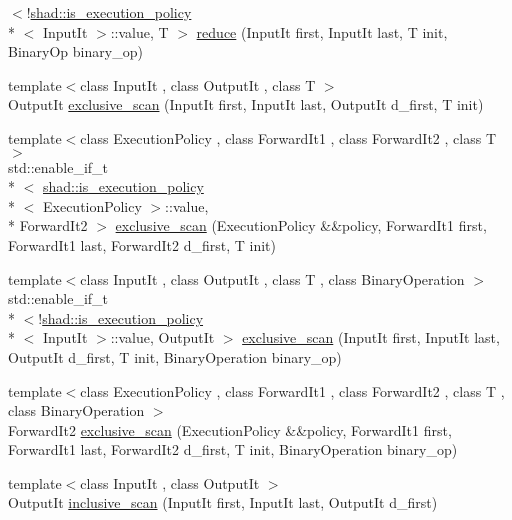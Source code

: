 \begin{DoxyCompactItemize}
$<$!\hyperlink{structshad_1_1is__execution__policy}{shad\-::is\-\_\-execution\-\_\-policy}\\*
$<$ Input\-It $>$\-::value, T $>$ \hyperlink{namespaceshad_a2807d313b1e6586657c742ae2b4c132d}{reduce} (Input\-It first, Input\-It last, T init, Binary\-Op binary\-\_\-op)
\item 
{\footnotesize template$<$class Input\-It , class Output\-It , class T $>$ }\\Output\-It \hyperlink{namespaceshad_af0252dc307b8ba0b96885c00e8871bbc}{exclusive\-\_\-scan} (Input\-It first, Input\-It last, Output\-It d\-\_\-first, T init)
\item 
{\footnotesize template$<$class Execution\-Policy , class Forward\-It1 , class Forward\-It2 , class T $>$ }\\std\-::enable\-\_\-if\-\_\-t\\*
$<$ \hyperlink{structshad_1_1is__execution__policy}{shad\-::is\-\_\-execution\-\_\-policy}\\*
$<$ Execution\-Policy $>$\-::value, \\*
Forward\-It2 $>$ \hyperlink{namespaceshad_a04c9040a1562793e895edaf3517dcfd6}{exclusive\-\_\-scan} (Execution\-Policy \&\&policy, Forward\-It1 first, Forward\-It1 last, Forward\-It2 d\-\_\-first, T init)
\item 
{\footnotesize template$<$class Input\-It , class Output\-It , class T , class Binary\-Operation $>$ }\\std\-::enable\-\_\-if\-\_\-t\\*
$<$!\hyperlink{structshad_1_1is__execution__policy}{shad\-::is\-\_\-execution\-\_\-policy}\\*
$<$ Input\-It $>$\-::value, Output\-It $>$ \hyperlink{namespaceshad_a3c4542507eba2afe28bb5d8af386b76d}{exclusive\-\_\-scan} (Input\-It first, Input\-It last, Output\-It d\-\_\-first, T init, Binary\-Operation binary\-\_\-op)
\item 
{\footnotesize template$<$class Execution\-Policy , class Forward\-It1 , class Forward\-It2 , class T , class Binary\-Operation $>$ }\\Forward\-It2 \hyperlink{namespaceshad_af1776fbb5971b5b37331938fa9f55e09}{exclusive\-\_\-scan} (Execution\-Policy \&\&policy, Forward\-It1 first, Forward\-It1 last, Forward\-It2 d\-\_\-first, T init, Binary\-Operation binary\-\_\-op)
\item 
{\footnotesize template$<$class Input\-It , class Output\-It $>$ }\\Output\-It \hyperlink{namespaceshad_a2854c58c1b96a1d20320f22a34bc2231}{inclusive\-\_\-scan} (Input\-It first, Input\-It last, Output\-It d\-\_\-first)

\end{DoxyCompactItemize}
